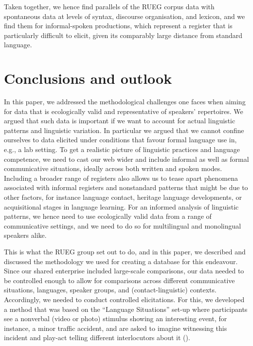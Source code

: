 \documentclass[output=paper,colorlinks,citecolor=brown]{langscibook}
\begin{document}
Taken together, we hence find parallels of the RUEG corpus data with spontaneous data at levels of syntax, discourse organisation, and lexicon, and we find them for informal-spoken productions, which represent a register that is particularly difficult to elicit, given its comparably large distance from standard language.

\section{Conclusions and outlook} \label{ch1:sec:4}

In this paper, we addressed the methodological challenges one faces when aiming for data that is ecologically valid and representative of speakers’ repertoires. We argued that such data is important if we want to account for actual linguistic patterns and linguistic variation. In particular we argued that we cannot confine ourselves to data elicited under conditions that favour formal language use in, e.g., a lab setting. To get a realistic picture of linguistic practices and language competence, we need to cast our web wider and include informal as well as formal communicative situations, ideally across both written and spoken modes. Including a broader range of registers also allows us to tease apart phenomena associated with informal registers and nonstandard patterns that might be due to other factors, for instance language contact, heritage language developments, or acquisitional stages in language learning. For an informed analysis of linguistic patterns, we hence need to use ecologically valid data from a range of communicative settings, and we need to do so for multilingual and monolingual speakers alike.

This is what the RUEG group set out to do, and in this paper, we described and discussed the methodology we used for creating a database for this endeavour. Since our shared enterprise included large-scale comparisons, our data needed to be controlled enough to allow for comparisons across different communicative situations, languages, speaker groups, and (contact-linguistic) contexts. Accordingly, we needed to conduct controlled elicitations. For this, we developed a method that was based on the “Language Situations” set-up where participants see a nonverbal (video or photo) stimulus showing an interesting event, for instance, a minor traffic accident, and are asked to imagine witnessing this incident and play-act telling different interlocutors about it (\citealt{wiese2020}).
\end{document}
